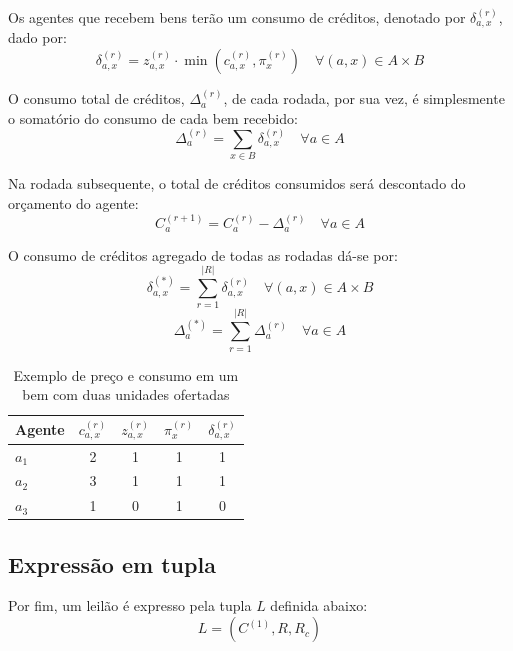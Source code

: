 \documentclass[
    12pt,
    openany,
    oneside,
    a4paper,
    english,
    brazil
]{abntex2}
\begin{document}
Os agentes que recebem bens terão um consumo de créditos, denotado por $\delta_{a, x}^{(r)}$, dado por:
\begin{equation}
    \delta_{a, x}^{(r)} = z_{a, x}^{(r)} \cdot \min\left(c_{a, x}^{(r)}, \pi_{x}^{(r)}\right)
    \quad
    \forall (a, x) \in A \times B
\end{equation}

O consumo total de créditos, $\Delta_a^{(r)}$, de cada rodada, por sua vez, é simplesmente o somatório do consumo de cada bem recebido:
\begin{equation}
    \Delta_a^{(r)} = \sum_{x \in B} \delta_{a, x}^{(r)}
    \quad
    \forall a \in A
\end{equation}

Na rodada subsequente, o total de créditos consumidos será descontado do orçamento do agente:
\begin{equation}
    C_a^{(r + 1)} = C_a^{(r)} - \Delta_a^{(r)}
    \quad \forall a \in A
\end{equation}

O consumo de créditos agregado de todas as rodadas dá-se por:
\begin{equation}
    \delta_{a,x}^{(*)} = \sum_{r = 1}^{|R|} \delta_{a,x}^{(r)}
    \quad
    \forall (a, x) \in A \times B
\end{equation}
\begin{equation}
    \Delta_{a}^{(*)} = \sum_{r = 1}^{|R|} \Delta_{a}^{(r)}
    \quad
    \forall a \in A
\end{equation}

\begin{table}[htbp]
\centering
\caption{Exemplo de preço e consumo em um bem com duas unidades ofertadas}
\label{tab:exemplo-preco}
\begin{tabular}{lcccc}
\toprule
\textbf{Agente} & $c_{a, x}^{(r)}$ & $z_{a, x}^{(r)}$ & $\pi_{x}^{(r)}$ & $\delta_{a, x}^{(r)}$ \\
\midrule
$a_1$ & 2 & 1 & 1 & 1 \\
$a_2$ & 3 & 1 & 1 & 1 \\
$a_3$ & 1 & 0 & 1 & 0 \\
\bottomrule
\end{tabular}
\end{table}

\subsection{Expressão em tupla}

Por fim, um leilão é expresso pela tupla $L$ definida abaixo:
\begin{equation}
    L = (C^{(1)}, R, R_c) 
\end{equation}
\end{document}
